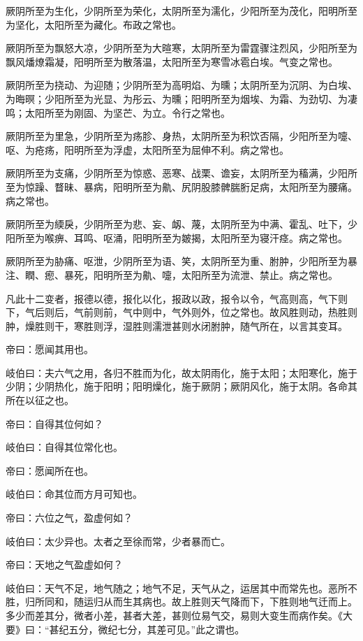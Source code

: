 \documentclass{article}%
\begin{document}
厥阴所至为生化，少阴所至为荣化，太阴所至为濡化，少阳所至为茂化，阳明所至为坚化，太阳所至为藏化。布政之常也。

厥阴所至为飘怒大凉，少阴所至为大暄寒，太阴所至为雷霆骤注烈风，少阳所至为飘风燔燎霜凝，阳明所至为散落温，太阳所至为寒雪冰雹白埃。气变之常也。

厥阴所至为挠动、为迎随；少阴所至为高明焰、为曛；太阴所至为沉阴、为白埃、为晦暝；少阳所至为光显、为彤云、为曛；阳明所至为烟埃、为霜、为劲切、为凄鸣；太阳所至为刚固、为坚芒、为立。令行之常也。

厥阴所至为里急，少阴所至为疡胗、身热，太阴所至为积饮否隔，少阳所至为嚏、呕、为疮疡，阳明所至为浮虚，太阳所至为屈伸不利。病之常也。

厥阴所至为支痛，少阴所至为惊惑、恶寒、战栗、谵妄，太阴所至为稸满，少阳所至为惊躁、瞀昧、暴病，阳明所至为鼽、尻阴股膝髀腨胻足病，太阳所至为腰痛。病之常也。

厥阴所至为緛戾，少阴所至为悲、妄、衂、蔑，太阴所至为中满、霍乱、吐下，少阳所至为喉痹、耳鸣、呕涌，阳明所至为皴揭，太阳所至为寝汗痉。病之常也。

厥阴所至为胁痛、呕泄，少阴所至为语、笑，太阴所至为重、胕肿，少阳所至为暴注、瞤、瘛、暴死，阳明所至为鼽、嚏，太阳所至为流泄、禁止。病之常也。

凡此十二变者，报德以德，报化以化，报政以政，报令以令，气高则高，气下则下，气后则后，气前则前，气中则中，气外则外，位之常也。故风胜则动，热胜则肿，燥胜则干，寒胜则浮，湿胜则濡泄甚则水闭胕肿，随气所在，以言其变耳。

帝曰：愿闻其用也。

岐伯曰：夫六气之用，各归不胜而为化，故太阴雨化，施于太阳；太阳寒化，施于少阴；少阴热化，施于阳明；阳明燥化，施于厥阴；厥阴风化，施于太阴。各命其所在以征之也。

帝曰：自得其位何如？

岐伯曰：自得其位常化也。

帝曰：愿闻所在也。

岐伯曰：命其位而方月可知也。

帝曰：六位之气，盈虚何如？

岐伯曰：太少异也。太者之至徐而常，少者暴而亡。

帝曰：天地之气盈虚如何？

岐伯曰：天气不足，地气随之；地气不足，天气从之，运居其中而常先也。恶所不胜，归所同和，随运归从而生其病也。故上胜则天气降而下，下胜则地气迁而上。多少而差其分，微者小差，甚者大差，甚则位易气交，易则大变生而病作矣。《大要》曰：“甚纪五分，微纪七分，其差可见。”此之谓也。
\end{document}
